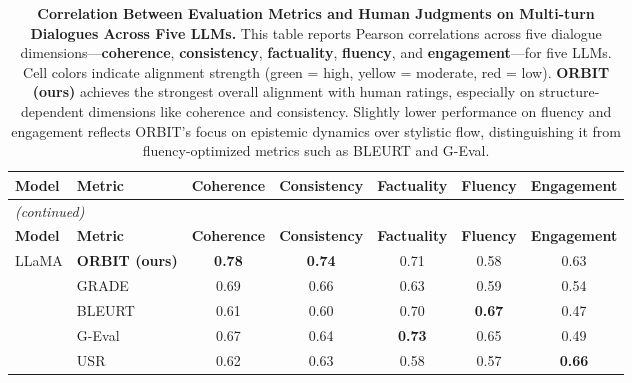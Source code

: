 \documentclass[11pt]{article}
\begin{document}
\onecolumn
\begin{longtable}{llccccc}
\caption{
\textbf{Correlation Between Evaluation Metrics and Human Judgments on Multi-turn Dialogues Across Five LLMs.}  
This table reports Pearson correlations across five dialogue dimensions—\textbf{coherence}, \textbf{consistency}, \textbf{factuality}, \textbf{fluency}, and \textbf{engagement}—for five LLMs. Cell colors indicate alignment strength (\textcolor{green!50!black}{green} = high, \textcolor{yellow!80!black}{yellow} = moderate, \textcolor{red!50!black}{red} = low). \textbf{ORBIT (ours)} achieves the strongest overall alignment with human ratings, especially on structure-dependent dimensions like coherence and consistency. Slightly lower performance on fluency and engagement reflects ORBIT's focus on epistemic dynamics over stylistic flow, distinguishing it from fluency-optimized metrics such as BLEURT and G-Eval.
}\\
\toprule
\textbf{Model} & \textbf{Metric} & \textbf{Coherence} & \textbf{Consistency} & \textbf{Factuality} & \textbf{Fluency} & \textbf{Engagement} \\
\midrule
\endfirsthead
\multicolumn{7}{l}{\textit{(continued)}} \\
\toprule
\textbf{Model} & \textbf{Metric} & \textbf{Coherence} & \textbf{Consistency} & \textbf{Factuality} & \textbf{Fluency} & \textbf{Engagement} \\
\midrule
\endhead
\multirow{8}{*}{LLaMA} 
& \textbf{ORBIT (ours)}      & \cellcolor{green!30}\textbf{0.78} & \cellcolor{green!30}\textbf{0.74} & \cellcolor{yellow!25}0.71 & \cellcolor{red!20}0.58 & \cellcolor{yellow!25}0.63 \\
& GRADE              & \cellcolor{green!15}0.69          & \cellcolor{green!15}0.66          & \cellcolor{yellow!25}0.63 & \cellcolor{yellow!25}0.59 & \cellcolor{yellow!15}0.54 \\
& BLEURT             & \cellcolor{yellow!25}0.61         & \cellcolor{yellow!25}0.60         & \cellcolor{green!15}0.70  & \cellcolor{green!15}\textbf{0.67} & \cellcolor{red!20}0.47 \\
& G-Eval             & \cellcolor{green!15}0.67          & \cellcolor{green!15}0.64          & \cellcolor{green!30}\textbf{0.73} & \cellcolor{green!15}0.65 & \cellcolor{red!20}0.49 \\
& USR                & \cellcolor{green!15}0.62          & \cellcolor{green!15}0.63          & \cellcolor{yellow!15}0.58 & \cellcolor{yellow!15}0.57 & \cellcolor{green!25}\textbf{0.66} \\

\end{longtable}
\end{document}
